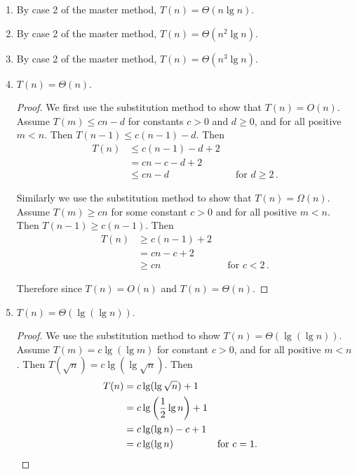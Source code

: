 \documentclass{abrice}
\begin{document}
\begin{enumerate}[label=(\alph*)]
\item By case 2 of the master method, $T(n) = \Theta(n \lg n)$.
\item By case 2 of the master method, $T(n) = \Theta(n^2 \lg n)$.
\item By case 2 of the master method, $T(n) = \Theta(n^3 \lg n)$.
\item $T(n) = \Theta(n)$.
  \begin{proof}
    We first use the substitution method to show that $T(n) = O(n)$. Assume
    $T(m) \leq cn - d$ for constants $c > 0$ and $d \geq 0$, and for all
    positive $m < n$. Then $T(n - 1) \leq c(n - 1) - d$. Then
    \begin{align*}
      T(n) &\leq c(n - 1) - d + 2 \\
      &= cn - c - d + 2 \\
      &\leq cn - d && \text{for } d \geq 2 \, .
    \end{align*}

    Similarly we use the substitution method to show that $T(n) = \Omega(n)$.
    Assume $T(m) \geq cn$ for some constant $c > 0$ and for all positive
    $m < n$. Then $T(n - 1) \geq c(n - 1)$. Then
    \begin{align*}
      T(n) &\geq c(n - 1) + 2 \\
      &= cn - c + 2 \\
      &\geq cn && \text{for } c < 2 \, .
    \end{align*}

    Therefore since $T(n) = O(n)$ and $T(n) = \Theta(n)$.
  \end{proof}
\item $T(n) = \Theta(\lg(\lg n))$.
  \begin{proof}
    We use the substitution method to show $T(n) = \Theta(\lg(\lg n))$. Assume
    $T(m) = c \lg(\lg m)$ for constant $c > 0$, and for all positive $m <
    n$. Then $T(\sqrt n) = c \lg(\lg \sqrt n)$. Then
    \begin{align*}
      T(n) &= c \lg(\lg \sqrt n) + 1 \\
      &= c \lg\left( {1 \over 2} \lg n \right) + 1 \\
      &= c \lg(\lg n) - c + 1 \\
      &= c \lg(\lg n) && \text{for } c = 1.
    \end{align*}
  \end{proof}
\end{enumerate}
\end{document}
